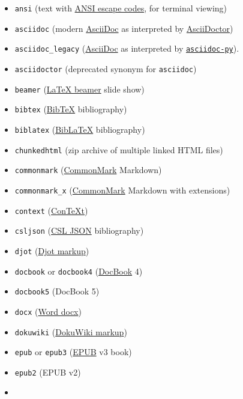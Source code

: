 \documentclass[
  b5paper
]{book}
\providecommand{\tightlist}{%
  \setlength{\itemsep}{0pt}\setlength{\parskip}{0pt}}
\begin{document}
\begin{description}
\label{output-formats}
\begin{itemize}
\tightlist
\item
  \texttt{ansi} (text with
  \href{https://en.wikipedia.org/wiki/ANSI_escape_code}{ANSI escape
  codes}, for terminal viewing)
\item
  \texttt{asciidoc} (modern \href{https://asciidoc.org/}{AsciiDoc} as
  interpreted by \href{https://asciidoctor.org/}{AsciiDoctor})
\item
  \texttt{asciidoc\_legacy} (\href{https://asciidoc.org/}{AsciiDoc} as
  interpreted by
  \href{https://github.com/asciidoc-py/asciidoc-py}{\texttt{asciidoc-py}}).
\item
  \texttt{asciidoctor} (deprecated synonym for \texttt{asciidoc})
\item
  \texttt{beamer} (\href{https://ctan.org/pkg/beamer}{LaTeX beamer}
  slide show)
\item
  \texttt{bibtex} (\href{https://ctan.org/pkg/bibtex}{BibTeX}
  bibliography)
\item
  \texttt{biblatex} (\href{https://ctan.org/pkg/biblatex}{BibLaTeX}
  bibliography)
\item
  \texttt{chunkedhtml} (zip archive of multiple linked HTML files)
\item
  \texttt{commonmark} (\href{https://commonmark.org}{CommonMark}
  Markdown)
\item
  \texttt{commonmark\_x} (\href{https://commonmark.org}{CommonMark}
  Markdown with extensions)
\item
  \texttt{context} (\href{https://www.contextgarden.net/}{ConTeXt})
\item
  \texttt{csljson}
  (\href{https://citeproc-js.readthedocs.io/en/latest/csl-json/markup.html}{CSL
  JSON} bibliography)
\item
  \texttt{djot} (\href{https://djot.net}{Djot markup})
\item
  \texttt{docbook} or \texttt{docbook4}
  (\href{https://docbook.org}{DocBook} 4)
\item
  \texttt{docbook5} (DocBook 5)
\item
  \texttt{docx}
  (\href{https://en.wikipedia.org/wiki/Office_Open_XML}{Word docx})
\item
  \texttt{dokuwiki} (\href{https://www.dokuwiki.org/dokuwiki}{DokuWiki
  markup})
\item
  \texttt{epub} or \texttt{epub3} (\href{http://idpf.org/epub}{EPUB} v3
  book)
\item
  \texttt{epub2} (EPUB v2)
\item

\end{itemize}
\end{description}
\end{document}
